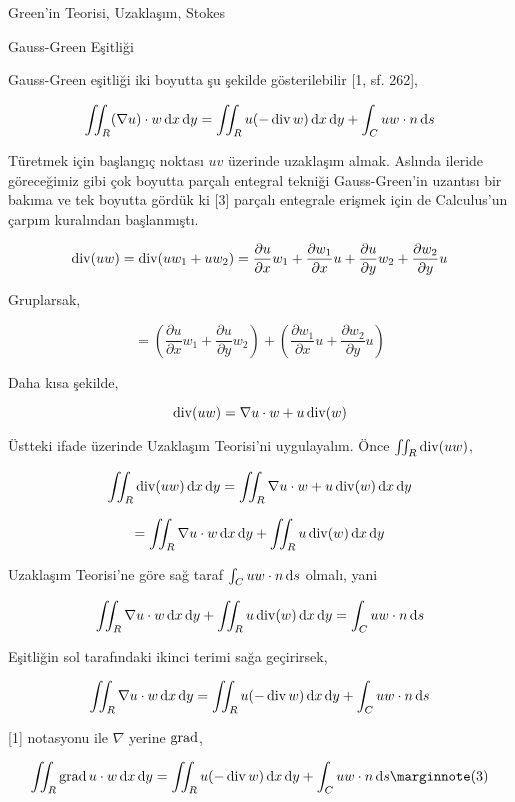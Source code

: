 \documentclass[12pt,fleqn]{article}\usepackage{../../common}
\begin{document}
Green'in Teorisi, Uzaklaşım, Stokes










Gauss-Green Eşitliği

Gauss-Green eşitliği iki boyutta şu şekilde gösterilebilir [1, sf. 262],

$$
\iint_R (\nabla u ) \cdot w \,\mathrm{d} x \,\mathrm{d} y =
\iint_R u (- \operatorname{div} w) \,\mathrm{d} x \,\mathrm{d} y + \int_C u w \cdot n \,\mathrm{d} s
$$

Türetmek için başlangıç noktası $uv$ üzerinde uzaklaşım almak. Aslında
ileride göreceğimiz gibi çok boyutta parçalı entegral tekniği Gauss-Green'in
uzantısı bir bakıma ve tek boyutta gördük ki [3] parçalı entegrale erişmek
için de Calculus'un çarpım kuralından başlanmıştı.

$$
\operatorname{div} (uw) = \operatorname{div} (u w_1 + u w_2) =
\frac{\partial u}{\partial x} w_1 +
\frac{\partial w_1}{\partial x} u +
\frac{\partial u}{\partial y} w_2 +
\frac{\partial w_2}{\partial y} u 
$$

Gruplarsak,

$$
= \left( 
\frac{\partial u}{\partial x} w_1 +
\frac{\partial u}{\partial y} w_2 \right) +
\left( 
\frac{\partial w_1}{\partial x} u +
\frac{\partial w_2}{\partial y} u \right)
$$

Daha kısa şekilde,

$$
\operatorname{div} (uw) = \nabla u \cdot w + u \operatorname{div}(w)
$$

Üstteki ifade üzerinde Uzaklaşım Teorisi'ni uygulayalım. Önce
$\iint_R \operatorname{div} (uw)$,

$$
\iint_R \operatorname{div} (uw) \,\mathrm{d} x \,\mathrm{d} y= \iint_R \nabla u \cdot w + u \operatorname{div}(w) \,\mathrm{d} x \,\mathrm{d} y
$$

$$
= \iint_R \nabla u \cdot w  \,\mathrm{d} x \,\mathrm{d} y + \iint_R u \operatorname{div}(w) \,\mathrm{d} x \,\mathrm{d} y
$$

Uzaklaşım Teorisi'ne göre sağ taraf $\int_C uw \cdot n \,\mathrm{d} s$ olmalı, yani

$$
\iint_R \nabla u \cdot w  \,\mathrm{d} x \,\mathrm{d} y + \iint_R u \operatorname{div}(w) \,\mathrm{d} x \,\mathrm{d} y = \int_C uw \cdot n \,\mathrm{d} s
$$

Eşitliğin sol tarafındaki ikinci terimi sağa geçirirsek,

$$
\iint_R \nabla u \cdot w  \,\mathrm{d} x \,\mathrm{d} y =
\iint_R u (-\operatorname{div} w) \,\mathrm{d} x \,\mathrm{d} y + \int_C uw \cdot n \,\mathrm{d} s
$$

[1] notasyonu ile $\nabla$ yerine $\operatorname{grad}$,

$$
\iint_R \grad u \cdot w  \ud x \ud y =
\iint_R u (-\bdiv w) \ud x \ud y + \int_C uw \cdot n \ud s
\mlabel{3}
$$
\end{document}
